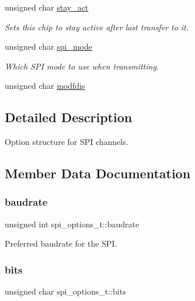 \begin{DoxyCompactItemize}
unsigned char \hyperlink{structspi__options__t_a7c76c05bc4b82544aabe1d71e68baef1}{stay\+\_\+act}
\begin{DoxyCompactList}\small\item\em Sets this chip to stay active after last transfer to it. \end{DoxyCompactList}\item 
unsigned char \hyperlink{structspi__options__t_a98a1b706e726c41dfb40c2b67719e722}{spi\+\_\+mode}
\begin{DoxyCompactList}\small\item\em Which S\+PI mode to use when transmitting. \end{DoxyCompactList}\item 
unsigned char \hyperlink{structspi__options__t_a25aaa6f8b4d65ae291edeb9e4c1c3b57}{modfdis}
\end{DoxyCompactItemize}


\subsection{Detailed Description}
Option structure for S\+PI channels. 

\subsection{Member Data Documentation}
\mbox{\label{structspi__options__t_a68bf86b07a5c69d257ae8d4a9c307b9e}} 
\subsubsection{\texorpdfstring{baudrate}{baudrate}}
{\footnotesize\ttfamily unsigned int spi\+\_\+options\+\_\+t\+::baudrate}



Preferred baudrate for the S\+PI. 

\mbox{\label{structspi__options__t_afdd53dbfebb4b94e95fa18a8e3037c65}} 
\subsubsection{\texorpdfstring{bits}{bits}}
{\footnotesize\ttfamily unsigned char spi\+\_\+options\+\_\+t\+::bits}




